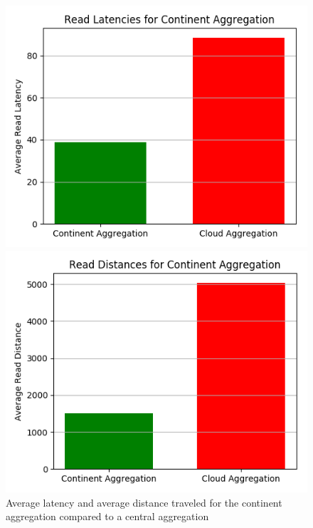 \begin{figure}[H]
\begin{minipage}{0.49\textwidth}
\centering
\includegraphics[width=1\linewidth]{Figures/Evaluation/read-by-latency-Continent-Aggregation.png}
\end{minipage}
\hfill
\begin{minipage}{0.49\textwidth}
\centering
\includegraphics[width=1\linewidth]{Figures/Evaluation/read-by-distance-Continent-Aggregation.png}
\end{minipage}
\label{fig:read-by-city}
\caption{Average latency and average distance traveled for the continent aggregation compared to a central aggregation}
\end{figure}

